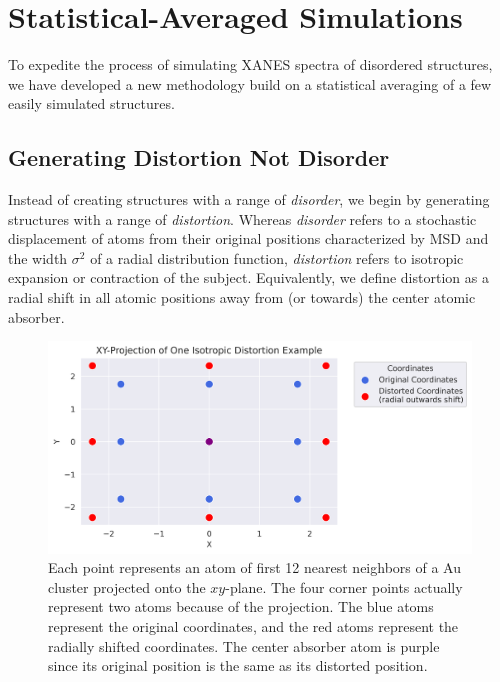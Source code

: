 \section{Statistical-Averaged Simulations}
To expedite the process of simulating XANES spectra of disordered structures, we have developed a new methodology build on a statistical averaging of a few easily simulated structures.

\subsection{Generating Distortion Not Disorder} \label{sec:start-disorder}
Instead of creating structures with a range of \textit{disorder}, we begin by generating structures with a range of \textit{distortion}. Whereas \textit{disorder} refers to a stochastic displacement of atoms from their original positions characterized by MSD and the width $ \sigma^2 $ of a radial distribution function, \textit{distortion} refers to isotropic expansion or contraction of the subject. Equivalently, we define distortion as a radial shift in all atomic positions away from (or towards) the center atomic absorber.

\begin{figure}[h]
	\centering
	\includegraphics[width=\linewidth]{Chapters/Figures/2d_distortion_example.png}
	\caption[2D Distortion]{Each point represents an atom of first 12 nearest neighbors of a Au cluster projected onto the $xy$\nobreakdash-plane. The four corner points actually represent two atoms because of the projection. The blue atoms represent the original coordinates, and the red atoms represent the radially shifted coordinates. The center absorber atom is purple since its original position is the same as its distorted position.}
	\label{fig:2d-distortion}
\end{figure}

